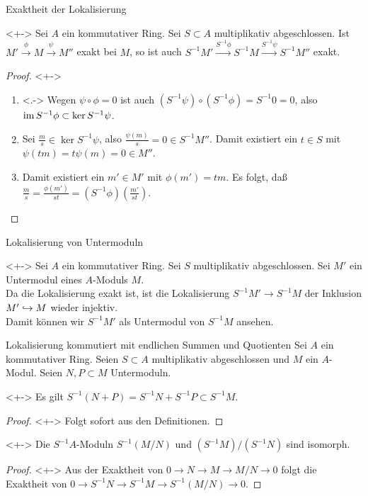 \begin{frame}{Exaktheit der Lokalisierung}
	\begin{proposition}<+->
		Sei \(A\) ein kommutativer Ring. Sei \(S \subset A\) multiplikativ abgeschlossen. Ist \(M' \xrightarrow{\phi} M
		\xrightarrow{\psi} M''\) exakt bei \(M\), so ist auch \(S^{-1} M' \xrightarrow{S^{-1}\phi} S^{-1} M \xrightarrow{S^{-1} \psi}
		S^{-1} M''\) exakt.
	\end{proposition}
	\begin{proof}<+->
		\begin{enumerate}[<+->]
		\item<.->
			Wegen \(\psi \circ \phi = 0\) ist auch \((S^{-1} \psi) \circ (S^{-1} \phi) = S^{-1} 0 = 0\), also
			\(\operatorname{im} S^{-1} \phi \subset \ker S^{-1} \psi\).
		\item
			Sei \(\frac m s \in \ker S^{-1} \psi\), also \(\frac{\psi(m)} s = 0 \in S^{-1} M''\). Damit existiert ein
			\(t \in S\) mit \(\psi(t m) = t \psi(m) = 0 \in M''\).
		\item
			Damit existiert ein \(m' \in M'\) mit \(\phi(m') = t m\). Es folgt, daß \(\frac m s = \frac{\phi(m')}{st}
			= (S^{-1} \phi)(\frac{m'}{st})\).
			\qedhere
		\end{enumerate}
	\end{proof}
\end{frame}

\begin{frame}{Lokalisierung von Untermoduln}
	\begin{example}<+->
		Sei \(A\) ein kommutativer Ring. Sei \(S\) multiplikativ abgeschlossen. Sei
		\(M'\) ein Untermodul eines \(A\)-Moduls \(M\).
		\\
		Da die Lokalisierung exakt ist, ist die Lokalisierung \(S^{-1} M' \to S^{-1} M\) der
		Inklusion \(M' \hookrightarrow M\) wieder injektiv.
		\\
		Damit können wir \(S^{-1} M'\) als Untermodul von \(S^{-1} M\) ansehen.
	\end{example}
\end{frame}

\begin{frame}{Lokalisierung kommutiert mit endlichen Summen und Quotienten}
	Sei \(A\) ein kommutativer Ring. Seien \(S \subset A\) multiplikativ abgeschlossen und
	\(M\) ein \(A\)-Modul. Seien \(N, P \subset M\) Untermoduln.
	\begin{corollary}<+->
		Es gilt \(S^{-1} (N + P) = S^{-1} N + S^{-1} P \subset S^{-1} M\).
	\end{corollary}
	\begin{proof}<+->
		Folgt sofort aus den Definitionen.
	\end{proof}
	\begin{corollary}<+->
		Die \(S^{-1} A\)-Moduln \(S^{-1}(M/N)\) und \((S^{-1} M)/(S^{-1} N)\) sind isomorph.
	\end{corollary}
	\begin{proof}<+->
		Aus der Exaktheit von \(0 \to N \to M \to M/N \to 0\) folgt die
		Exaktheit von \(0 \to S^{-1} N \to S^{-1} M \to S^{-1}(M/N) \to 0\).
	\end{proof}
\end{frame}

